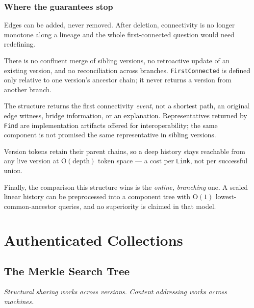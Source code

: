 \documentclass[11pt,twoside,openright]{book}
\newcommand{\code}[1]{\texorpdfstring{\textcolor{d7ink}{\texttt{#1}}}{#1}}
\newcommand{\bigoh}[1]{$\mathrm{O}(#1)$}
\newcommand{\motto}[1]{%
  \begingroup
  \vspace{-4pt}\hfill\begin{minipage}{0.80\textwidth}
    \raggedleft\itshape\color{d7slate}\small #1\par
  \end{minipage}\par\vspace{18pt}
  \endgroup}
\begin{document}
\section{Where the guarantees stop}

\begin{caveatbox}
Edges can be added, never removed. After deletion, connectivity is no longer
monotone along a lineage and the whole first-connected question would need
redefining.

There is no confluent merge of sibling versions, no retroactive update of an
existing version, and no reconciliation across branches. \code{FirstConnected} is
defined only relative to one version's ancestor chain; it never returns a version
from another branch.

The structure returns the first connectivity \emph{event}, not a shortest path,
an original edge witness, bridge information, or an explanation. Representatives
returned by \code{Find} are implementation artifacts offered for interoperability;
the same component is not promised the same representative in sibling versions.

Version tokens retain their parent chains, so a deep history stays reachable from
any live version at \bigoh{\text{depth}} token space --- a cost per \code{Link},
not per successful union.

Finally, the comparison this structure wins is the \emph{online, branching} one.
A sealed linear history can be preprocessed into a component tree with \bigoh{1}
lowest-common-ancestor queries, and no superiority is claimed in that model.
\end{caveatbox}


\part{Authenticated Collections}
\label{part:authenticated}

\chapter{The Merkle Search Tree}
\label{ch:mst}

\motto{Structural sharing works across versions. Content addressing works across
machines.}
\end{document}
